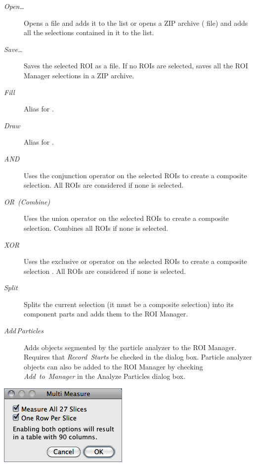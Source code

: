 \begin{minipage}[c][1\totalheight][t]{0.748\columnwidth}%
\begin{description}
\item [{\emph{Open\ldots{}}}] Opens a  file and adds
it to the list or opens a ZIP archive (
file) and adds all the selections contained in it to the list.
\item [{\emph{Save\ldots{}}}] Saves the selected ROI as a 
file. If no ROIs are selected, saves all the ROI Manager selections
in a ZIP archive.
\item [{\emph{Fill}}] Alias for .
\item [{\emph{Draw}}] Alias for .
\item [{\emph{AND}}] Uses the conjunction operator on the selected ROIs
to create a composite selection. All ROIs are considered if none is
selected.
\item [{\emph{OR\ (Combine)}}] Uses the union operator on the selected
ROIs to create a composite selection. Combines all ROIs if none is
selected.\end{description}
%
\end{minipage}
\begin{description}
\item [{\emph{XOR}}] Uses the exclusive or operator on the selected ROIs
to create a composite selection \cite{C-RM-XOR}. All ROIs are considered
if none is selected.
\item [{\emph{Split}}] Splits the current selection (it must be a composite
selection) into its component parts and adds them to the ROI Manager.
\item [{\emph{Add\,Particles}}] Adds objects segmented by the particle
analyzer to the ROI Manager. Requires that \emph{Record~Starts} be
checked in the 
dialog box. Particle analyzer objects can also be added to the ROI
Manager by checking \emph{Add}\ \emph{to}\ \emph{Manager} in the
Analyze Particles dialog box.
\end{description}
\begin{minipage}[c][1\totalheight][t]{0.347\columnwidth}%
\begin{description}
\item [{\includegraphics[scale=0.55]{images/ROIManagerMultiMeasure}}]~\end{description}
%
\end{minipage}%
